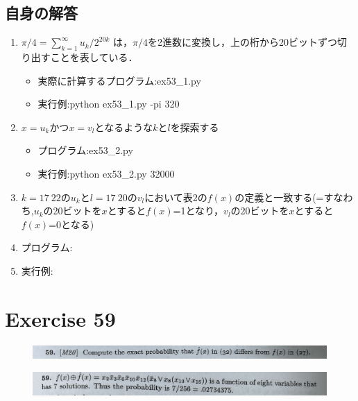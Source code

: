 \documentclass[dvipdfmx,a4paper,12pt]{jsarticle}
\begin{document}
\newpage
 \subsection*{自身の解答}
 \begin{enumerate}
 
\item  $π/4 = \sum_{k=1}^\infty u_{k}/2^{20k}$ は，$π/4$を2進数に変換し，上の桁から20ビットずつ切り出すことを表している．
 
\begin{itemize}
\item 実際に計算するプログラム:ex53\_1.py
\item 実行例:python ex53\_1.py -pi 320
\end{itemize}

\item $x=u_{k}$かつ$x=v_{l}$となるような$k$と$l$を探索する
\begin{itemize}
\item プログラム:ex53\_2.py
\item 実行例:python ex53\_2.py 32000
\end{itemize}

\item  $k=17~22$の$u_{k}$と$l=17~20$の$v_{l}$において表2の$f(x)$の定義と一致する(=すなわち,$u_{k}$の20ビットを$x$とすると$f(x)$=1となり，$v_{l}$の20ビットを$x$とすると$f(x)$=0となる)
\item プログラム:
\item 実行例:
 \end{enumerate}

\section*{Exercise 59}
 \begin{figure}[htbp]
  \centering
  \includegraphics[width=142mm,angle=0]{images/59.jpg}
  \end{figure}

 \begin{figure}[htbp]
  \centering
  \includegraphics[width=142mm,angle=0]{images/59a.jpg}
  \end{figure}
  
\end{document}
